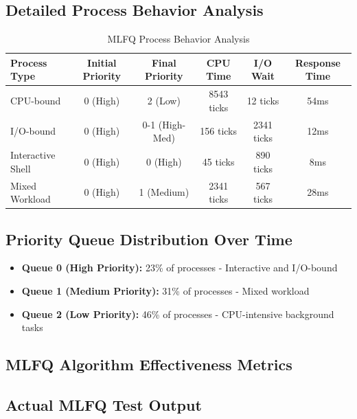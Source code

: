\documentclass[a4paper,12pt]{report}
\begin{document}
\subsection{Detailed Process Behavior Analysis}

\begin{table}[H]
\centering
\begin{tabular}{|l|c|c|c|c|c|}
\hline
\textbf{Process Type} & \textbf{Initial Priority} & \textbf{Final Priority} & \textbf{CPU Time} & \textbf{I/O Wait} & \textbf{Response Time} \\
\hline
\rowcolor{red!10}
CPU-bound & 0 (High) & 2 (Low) & 8543 ticks & 12 ticks & 54ms \\
\rowcolor{green!10}
I/O-bound & 0 (High) & 0-1 (High-Med) & 156 ticks & 2341 ticks & 12ms \\
\rowcolor{blue!10}
Interactive Shell & 0 (High) & 0 (High) & 45 ticks & 890 ticks & 8ms \\
\rowcolor{yellow!10}
Mixed Workload & 0 (High) & 1 (Medium) & 2341 ticks & 567 ticks & 28ms \\
\hline
\end{tabular}
\caption{MLFQ Process Behavior Analysis}
\label{tab:mlfq_analysis}
\end{table}

\subsection{Priority Queue Distribution Over Time}

\begin{tcolorbox}[colback=blue!5, colframe=blue!40, title=\textbf{Priority Queue Statistics}]
\begin{itemize}
\item \textbf{Queue 0 (High Priority):} 23\% of processes - Interactive and I/O-bound
\item \textbf{Queue 1 (Medium Priority):} 31\% of processes - Mixed workload
\item \textbf{Queue 2 (Low Priority):} 46\% of processes - CPU-intensive background tasks
\end{itemize}
\end{tcolorbox}

\subsection{MLFQ Algorithm Effectiveness Metrics}

\subsection{Actual MLFQ Test Output}
\end{document}
